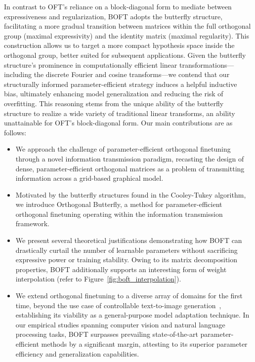 In contrast to OFT's reliance on a block-diagonal form to mediate between expressiveness and regularization, BOFT adopts the butterfly structure, facilitating a more gradual transition between matrices within the full orthogonal group (maximal expressivity) and the identity matrix (maximal regularity). This construction allows us to target a more compact hypothesis space inside the orthogonal group, better suited for subsequent applications. Given the butterfly structure’s prominence in computationally efficient linear transformations—including the discrete Fourier and cosine transforms—we contend that our structurally informed parameter-efficient strategy induces a helpful inductive bias, ultimately enhancing model generalization and reducing the risk of overfitting. This reasoning stems from the unique ability of the butterfly structure to realize a wide variety of traditional linear transforms, an ability unattainable for OFT’s block-diagonal form. Our main contributions are as follows:

\begin{itemize}[leftmargin=*,nosep]
    \item We approach the challenge of parameter-efficient orthogonal finetuning through a novel information transmission paradigm, recasting the design of dense, parameter-efficient orthogonal matrices as a problem of transmitting information across a grid-based graphical model.
    \item Motivated by the butterfly structures found in the Cooley-Tukey algorithm, we introduce Orthogonal Butterfly, a method for parameter-efficient orthogonal finetuning operating within the information transmission framework.
    \item We present several theoretical justifications demonstrating how BOFT can drastically curtail the number of learnable parameters without sacrificing expressive power or training stability. Owing to its matrix decomposition properties, BOFT additionally supports an interesting form of weight interpolation (refer to Figure~\ref{fig:boft_interpolation}).
    \item We extend orthogonal finetuning to a diverse array of domains for the first time, beyond the use case of controllable text-to-image generation~\cite{qiu2023controlling}, establishing its viability as a general-purpose model adaptation technique. In our empirical studies spanning computer vision and natural language processing tasks, BOFT surpasses prevailing state-of-the-art parameter-efficient methods by a significant margin, attesting to its superior parameter efficiency and generalization capabilities.
\end{itemize}

